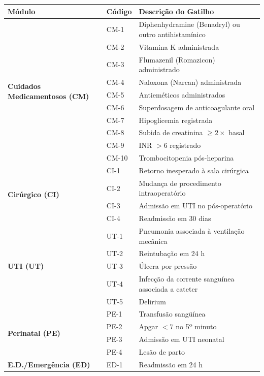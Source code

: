 \begin{apendicesenv}
\begin{quadro}[htb]
\centering
\small
\caption{Especificação dos Módulos Assistenciais e Gatilhos GTT (IHI).}
\label{qua_modulos_completos}
\begin{tabularx}{\textwidth}{l l X}
\toprule
\textbf{Módulo} & \textbf{Código} & \textbf{Descrição do Gatilho} \\
\midrule
\multirow{10}{*}{\textbf{Cuidados Medicamentosos (CM)}}
  & CM-1 & Diphenhydramine (Benadryl) ou outro antihistamínico \\
  & CM-2 & Vitamina K administrada \\
  & CM-3 & Flumazenil (Romazicon) administrado \\
  & CM-4 & Naloxona (Narcan) administrada \\
  & CM-5 & Antieméticos administrados \\
  & CM-6 & Superdosagem de anticoagulante oral \\
  & CM-7 & Hipoglicemia registrada \\
  & CM-8 & Subida de creatinina $\geq 2\times$ basal \\
  & CM-9 & INR $> 6$ registrado \\
  & CM-10 & Trombocitopenia pós-heparina \\
\midrule
\multirow{4}{*}{\textbf{Cirúrgico (CI)}}
  & CI-1 & Retorno inesperado à sala cirúrgica \\
  & CI-2 & Mudança de procedimento intraoperatório \\
  & CI-3 & Admissão em UTI no pós-operatório \\
  & CI-4 & Readmissão em 30 dias \\
\midrule
\multirow{5}{*}{\textbf{UTI (UT)}}
  & UT-1 & Pneumonia associada à ventilação mecânica \\
  & UT-2 & Reintubação em 24 h \\
  & UT-3 & Úlcera por pressão \\
  & UT-4 & Infecção da corrente sanguínea associada a cateter \\
  & UT-5 & Delirium \\
\midrule
\multirow{4}{*}{\textbf{Perinatal (PE)}}
  & PE-1 & Transfusão sangüínea \\
  & PE-2 & Apgar $< 7$ no 5º minuto \\
  & PE-3 & Admissão em UTI neonatal \\
  & PE-4 & Lesão de parto \\
\midrule
\multirow{3}{*}{\textbf{E.D./Emergência (ED)}}
  & ED-1 & Readmissão em 24 h \\

\end{tabularx}
\end{quadro}
\end{apendicesenv}
